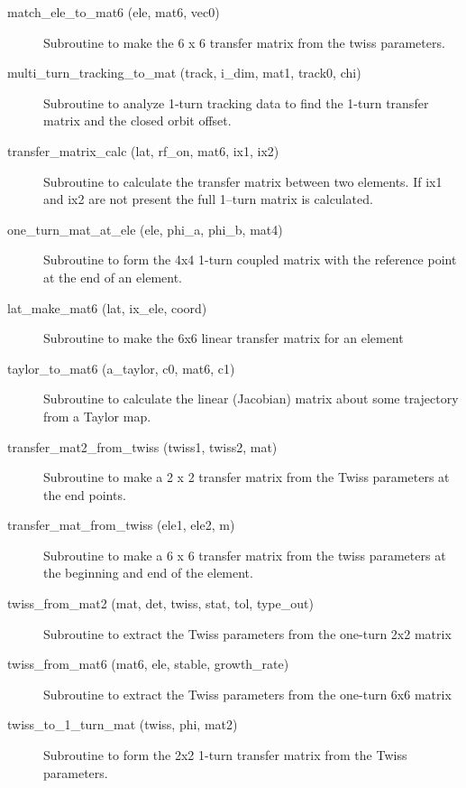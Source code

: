 \begin{description}
\label{r:match.ele.to.mat6}
\item[match_ele_to_mat6 (ele, mat6, vec0)] \Newline 
Subroutine to make the 6 x 6 transfer matrix from the twiss parameters.

\item[multi_turn_tracking_to_mat (track, i_dim, mat1, track0, chi)] \Newline
Subroutine to analyze 1-turn tracking data to find the 1-turn transfer matrix 
and the closed orbit offset.

\label{r:transfer.matrix.calc}
\item[transfer_matrix_calc (lat, rf_on, mat6, ix1, ix2)] \Newline
Subroutine to calculate the transfer matrix between two elements. If
ix1 and ix2 are not present the full 1--turn matrix is calculated.

\label{r:one.turn.mat.at.ele}
\item[one_turn_mat_at_ele (ele, phi_a, phi_b, mat4)] \Newline
Subroutine to form the 4x4 1-turn coupled matrix with the reference point 
at the end of an element. 

\label{r:lat.make.mat6}
\item[lat_make_mat6 (lat, ix_ele, coord)] \Newline
Subroutine to make the 6x6 linear transfer matrix for an element 

\item[taylor_to_mat6 (a_taylor, c0, mat6, c1)] \Newline
Subroutine to calculate the linear (Jacobian) matrix about some trajectory from a Taylor map. 

\label{r:transfer.mat2.from.twiss}
\item[transfer_mat2_from_twiss (twiss1, twiss2, mat)] \Newline
Subroutine to make a 2 x 2 transfer matrix from the Twiss parameters at the end points. 

\label{r:transfer.mat.from.twiss}
\item[transfer_mat_from_twiss (ele1, ele2, m)] \Newline 
Subroutine to make a 6 x 6 transfer matrix from the twiss parameters
at the beginning and end of the element.

\label{r:twiss.from.mat2}
\item[twiss_from_mat2 (mat, det, twiss, stat, tol, type_out)] \Newline
Subroutine to extract the Twiss parameters from the one-turn 2x2 matrix 

\label{r:twiss.from.mat6}
\item[twiss_from_mat6 (mat6, ele, stable, growth_rate)] \Newline
Subroutine to extract the Twiss parameters from the one-turn 6x6 matrix 

\item[twiss_to_1_turn_mat (twiss, phi, mat2)] \Newline
Subroutine to form the 2x2 1-turn transfer matrix from the Twiss parameters. 

\end{description}

